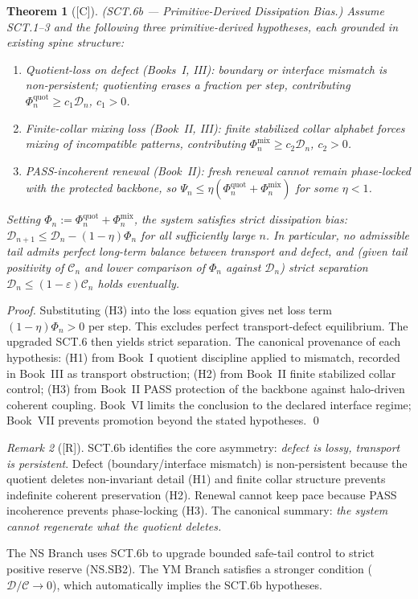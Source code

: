 \documentclass[12pt,oneside]{amsbook}
\theoremstyle{plain}
\newtheorem{theorem}{Theorem}[section]
\theoremstyle{definition}
\theoremstyle{remark}
\newtheorem{remark}[theorem]{Remark}
\newcommand{\status}[1]{\textup{[#1]}}
\begin{document}
\begin{theorem}[\status{C}]\label{thm:SCT6b}
\textup{(SCT.6b --- Primitive-Derived Dissipation Bias.)}
Assume SCT.1--3 and the following three primitive-derived hypotheses,
each grounded in existing spine structure:
\begin{enumerate}[label=\textup{(H\arabic*)}]
\item \textup{Quotient-loss on defect} (Books~I, III): boundary or
  interface mismatch is non-persistent; quotienting erases a fraction
  per step, contributing $\Phi_n^{\mathrm{quot}} \geq c_1
  \mathcal{D}_n$, $c_1 > 0$.
\item \textup{Finite-collar mixing loss} (Book~II, III): finite
  stabilized collar alphabet forces mixing of incompatible patterns,
  contributing $\Phi_n^{\mathrm{mix}} \geq c_2 \mathcal{D}_n$,
  $c_2 > 0$.
\item \textup{PASS-incoherent renewal} (Book~II): fresh renewal
  cannot remain phase-locked with the protected backbone, so
  $\Psi_n \leq \eta(\Phi_n^{\mathrm{quot}} + \Phi_n^{\mathrm{mix}})$
  for some $\eta < 1$.
\end{enumerate}
Setting $\Phi_n := \Phi_n^{\mathrm{quot}} + \Phi_n^{\mathrm{mix}}$,
the system satisfies strict dissipation bias:
$\mathcal{D}_{n+1} \leq \mathcal{D}_n - (1-\eta)\Phi_n$ for all
sufficiently large $n$.  In particular, no admissible tail admits
perfect long-term balance between transport and defect, and
(given tail positivity of $\mathcal{C}_n$ and lower comparison of
$\Phi_n$ against $\mathcal{D}_n$) strict separation
$\mathcal{D}_n \leq (1-\varepsilon)\mathcal{C}_n$ holds eventually.
\end{theorem}

\begin{proof}
Substituting (H3) into the loss equation gives net loss term
$(1-\eta)\Phi_n > 0$ per step.  This excludes perfect
transport-defect equilibrium.  The upgraded SCT.6 then yields strict
separation.  The canonical provenance of each hypothesis:
(H1) from Book~I quotient discipline applied to mismatch, recorded
in Book~III as transport obstruction; (H2) from Book~II finite
stabilized collar control; (H3) from Book~II PASS protection of the
backbone against halo-driven coherent coupling.  Book~VI limits the
conclusion to the declared interface regime; Book~VII prevents
promotion beyond the stated hypotheses. \qed
\end{proof}

\begin{remark}[\status{R}]
SCT.6b identifies the core asymmetry: \emph{defect is lossy,
transport is persistent}.  Defect (boundary/interface mismatch) is
non-persistent because the quotient deletes non-invariant detail
(H1) and finite collar structure prevents indefinite coherent
preservation (H2).  Renewal cannot keep pace because PASS
incoherence prevents phase-locking (H3).  The canonical summary:
\emph{the system cannot regenerate what the quotient deletes.}

The NS Branch uses SCT.6b to upgrade bounded safe-tail control to
strict positive reserve (NS.SB2).  The YM Branch satisfies a
stronger condition ($\mathcal{D}/\mathcal{C} \to 0$), which
automatically implies the SCT.6b hypotheses.
\end{remark}
\end{document}
